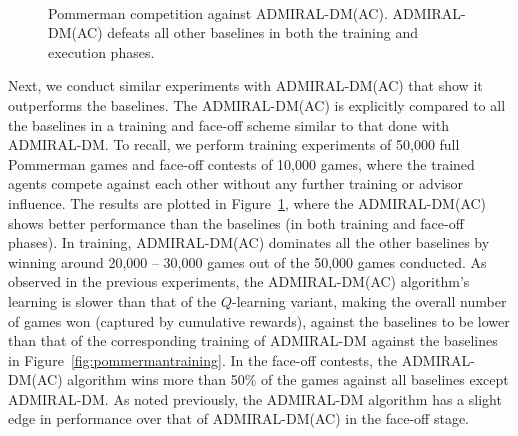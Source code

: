 \documentclass[jair, twoside,11pt,theapa]{article}
\begin{document}
\begin{figure}[h]
    \centering
	\\
	\quad
  \caption{Pommerman competition against ADMIRAL-DM(AC). ADMIRAL-DM(AC) defeats all other baselines in both the training and execution phases. 
  }%
	\label{fig:pommermantraining-actorcritic}
\end{figure}




Next, we conduct similar experiments with ADMIRAL-DM(AC) that show it outperforms the baselines. The ADMIRAL-DM(AC) is explicitly compared to all the baselines in a training and face-off scheme similar to that done with ADMIRAL-DM. To recall, we perform training experiments of 50,000 full Pommerman games and face-off contests of 10,000 games, where the trained agents compete against each other without any further training or advisor influence. The results are plotted in Figure~\ref{fig:pommermantraining-actorcritic}, where the ADMIRAL-DM(AC) shows better performance than the baselines (in both training and face-off phases). In training,  ADMIRAL-DM(AC) dominates all the other baselines by winning around 20,000 -- 30,000 games out of the 50,000 games conducted. As observed in the previous experiments, the ADMIRAL-DM(AC) algorithm's learning is slower than that of the $Q$-learning variant, making the overall number of games won (captured by cumulative rewards), against the baselines to be lower than that of the corresponding training of ADMIRAL-DM against the baselines in Figure~\ref{fig:pommermantraining}. In the face-off contests, the ADMIRAL-DM(AC) algorithm wins more than 50\% of the games against all baselines except ADMIRAL-DM. As noted previously, the ADMIRAL-DM algorithm has a slight edge in performance over that of ADMIRAL-DM(AC) in the face-off stage. 
\end{document}
